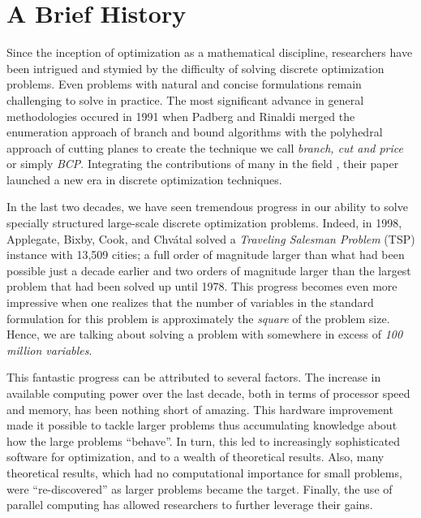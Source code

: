 \section{A Brief History}

Since the inception of optimization as a mathematical discipline,
researchers have been intrigued and stymied by the
difficulty of solving discrete
optimization problems. Even problems with natural and concise formulations
remain 
challenging to solve in practice. The most significant advance in general
methodologies occured in 1991 when Padberg and Rinaldi
\cite{A:padberg-rinaldi} merged the enumeration approach of branch and bound
algorithms with the polyhedral approach of cutting planes to create
the technique we call {\em branch, cut
and price} or simply {\em BCP}. 
Integrating the contributions of many in the field , their paper launched a
new era in discrete optimization techniques.

In the last two decades, we have seen tremendous progress in our
ability to solve specially structured large-scale discrete 
optimization problems. Indeed,
in 1998, Applegate, Bixby, Cook, and Chv\'atal \cite{W:concorde}
solved a {\em Traveling
Salesman Problem} (TSP) instance with 13,509 cities; a full order of
magnitude larger than what had been possible just a decade earlier
and two orders of magnitude larger than the largest
problem that had been solved up until 1978. This progress becomes even
more impressive when one realizes that the number of variables in the
standard formulation for this problem is approximately the {\em
square} of the problem size. Hence, we are talking about solving a
problem with somewhere in excess of {\em 100 million variables}.

This fantastic progress can be attributed to several factors. 
The increase in available computing power over the last decade, both
in terms of processor speed and memory, has been nothing short of
amazing. This hardware improvement made it possible to tackle larger problems
thus accumulating knowledge about how the large problems ``behave''. In turn,
this led to increasingly sophisticated software for
optimization, and to a wealth of theoretical results.
Also, many theoretical results, which had no computational importance for
small problems, were ``re-discovered'' as larger problems
became the target. Finally, the use of
parallel computing has allowed researchers to further leverage their
gains.

